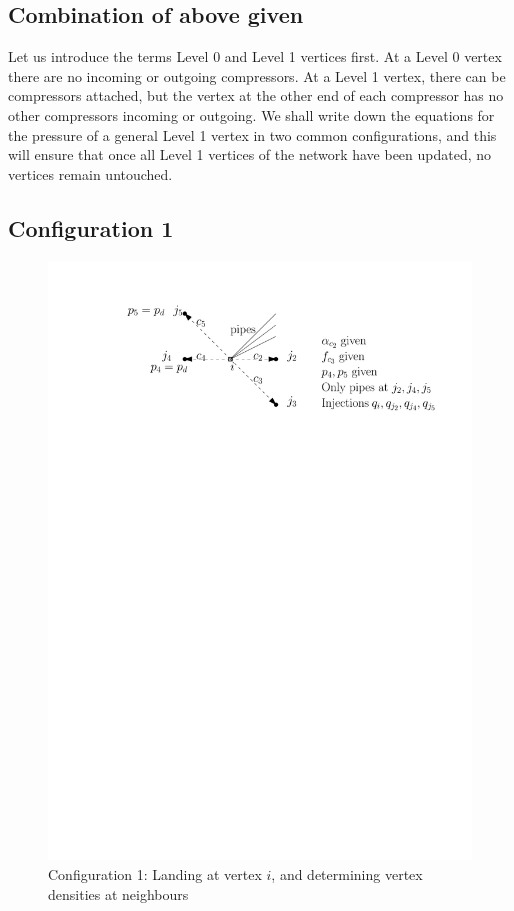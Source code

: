 \documentclass{amsart}
\begin{document}
\subsection{Combination of above given}
Let us introduce the terms Level 0 and Level 1 vertices first. At a Level 0 vertex there are no incoming or outgoing compressors. At a Level 1 vertex, there can be compressors attached, but the vertex at the other end of each compressor has no other compressors incoming or outgoing. 
We shall write down the equations for the pressure of a  general Level 1 vertex in two common configurations, and this will ensure that once all Level 1 vertices of the network have been updated, no vertices remain untouched. 

\subsection{Configuration 1}
\begin{figure}[htb]
\includegraphics[scale=1]{fig1}
\caption{Configuration 1: Landing at vertex $i$, and determining vertex densities at neighbours}
\label{fig:config1}
\end{figure}
\end{document}
